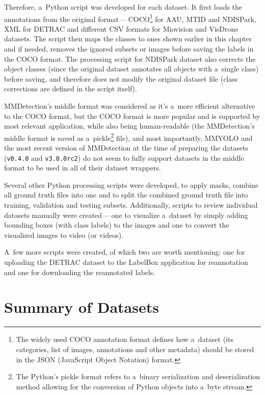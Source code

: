 Therefore, a~Python script was developed for each dataset. It first loads the
annotations from the original format\,---\,COCO\footnote{The widely used COCO
annotation format defines how a~dataset (its categories, list of images,
annotations and other metadata) should be stored in the JSON (JavaScript Object
Notation) format.} for AAU, MTID
and NDISPark, XML for DETRAC and different CSV formats for Miovision and VisDrone datasets.
The script then maps the classes to ones shown earlier in this chapter and if
needed, removes the ignored subsets or images before saving the labels in the
COCO format. The processing script for NDISPark dataset also corrects the object
classes (since the original dataset annotates all objects with a~single class)
before saving, and therefore does not modify the original dataset file (class
corrections are defined in the script itself).

MMDetection's middle format was considered as it's a~more efficient alternative
to the COCO format, but the COCO format is more popular and is supported by most
relevant application, while also being human-readable (the MMDetection's middle
format is saved as a~pickle\footnote{The Python's pickle format refers to
a~binary serialization and deserialization method allowing for the conversion of
Python objects into a~byte stream.} file), and most importantly, MMYOLO and the
most recent version of MMDetection at the time of preparing the datasets
(\texttt{v0.4.0} and \texttt{v3.0.0rc2}) do not seem to fully support datasets
in the middle format to be used in all of their dataset wrappers.

Several other Python processing scripts were developed, to apply masks, combine
all ground truth files into one and to split the combined ground truth file into
training, validation and testing subsets. Additionally, scripts to review
individual datasets manually were created\,---\,one to visualize a~dataset by simply
adding bounding boxes (with class labels) to the images and one to convert the
visualized images to video (or videos).

A~few more scripts were created, of which two are worth mentioning: one for
uploading the DETRAC dataset to the LabelBox application for reannotation and
one for downloading the reannotated labels.


\section{Summary of Datasets}

